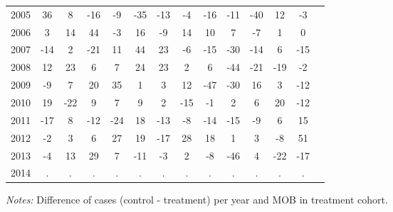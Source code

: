 \begin{table}[H]
\begin{threeparttable}
{\begin{tabular}{l*{13}{c}}
2005        &          36&           8&         -16&          -9&         -35&         -13&          -4&         -16&         -11&         -40&          12&          -3\\
2006        &           3&          14&          44&          -3&          16&          -9&          14&          10&           7&          -7&           1&           0\\
2007        &         -14&           2&         -21&          11&          44&          23&          -6&         -15&         -30&         -14&           6&         -15\\
2008        &          12&          23&           6&           7&          24&          23&           2&           6&         -44&         -21&         -19&          -2\\
2009        &          -9&           7&          20&          35&           1&           3&          12&         -47&         -30&          16&           3&         -12\\
2010        &          19&         -22&           9&           7&           9&           2&         -15&          -1&           2&           6&          20&         -12\\
2011        &         -17&           8&         -12&         -24&          18&         -13&          -8&         -14&         -15&          -9&           6&          15\\
2012        &          -2&           3&           6&          27&          19&         -17&          28&          18&           1&           3&          -8&          51\\
2013        &          -4&          13&          29&           7&         -11&          -3&           2&          -8&         -46&           4&         -22&         -17\\
2014        &           .&           .&           .&           .&           .&           .&           .&           .&           .&           .&           .&           .\\
 \bottomrule \end{tabular} } \begin{tablenotes} \item \scriptsize \emph{Notes:} Difference of cases (control - treatment) per year and MOB in treatment cohort. \end{tablenotes} \end{threeparttable} \end{table} 
